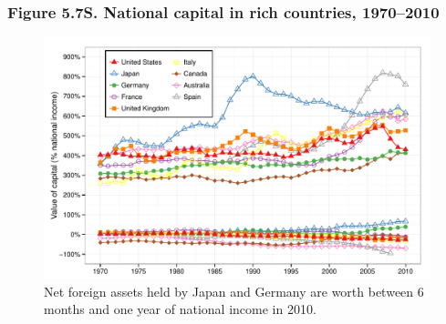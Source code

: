 \documentclass[t]{beamer}\usepackage[]{graphicx}\usepackage[]{color}
\newenvironment{knitrout}{}{} %
\begin{document}
\begin{frame}[label=Figure_5_7S]
\frametitle{Figure 5.7S. National capital in rich countries, 1970--2010}
\begin{figure}[t]
\begin{minipage}[b]{\textwidth}
\centering
\begin{knitrout}\footnotesize
{}\color{fgcolor}

{\centering \includegraphics[width=1\linewidth]{figures/color/Figure_5_7S} 

}



\end{knitrout}
\caption{Net foreign assets held by Japan and Germany are worth between 6 months and one year of national income in 2010.}
\end{minipage}
\end{figure}
\end{frame}
\end{document}

